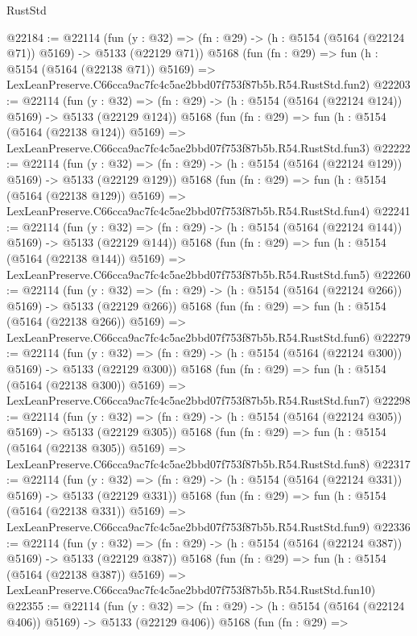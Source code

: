\begin{lexlean}{RustStd}
\begin{coremodule}
@22184 := @22114
    (fun (y : @32) => (fn : @29) -> (h : @5154 (@5164 (@22124 @71)) @5169) -> @5133 (@22129 @71))
    @5168
    (fun (fn : @29) =>
    fun (h : @5154 (@5164 (@22138 @71)) @5169) =>
    LexLeanPreserve.C66cca9ac7fc4c5ae2bbd07f753f87b5b.R54.RustStd.fun2)
@22203 := @22114
    (fun (y : @32) => (fn : @29) -> (h : @5154 (@5164 (@22124 @124)) @5169) -> @5133 (@22129 @124))
    @5168
    (fun (fn : @29) =>
    fun (h : @5154 (@5164 (@22138 @124)) @5169) =>
    LexLeanPreserve.C66cca9ac7fc4c5ae2bbd07f753f87b5b.R54.RustStd.fun3)
@22222 := @22114
    (fun (y : @32) => (fn : @29) -> (h : @5154 (@5164 (@22124 @129)) @5169) -> @5133 (@22129 @129))
    @5168
    (fun (fn : @29) =>
    fun (h : @5154 (@5164 (@22138 @129)) @5169) =>
    LexLeanPreserve.C66cca9ac7fc4c5ae2bbd07f753f87b5b.R54.RustStd.fun4)
@22241 := @22114
    (fun (y : @32) => (fn : @29) -> (h : @5154 (@5164 (@22124 @144)) @5169) -> @5133 (@22129 @144))
    @5168
    (fun (fn : @29) =>
    fun (h : @5154 (@5164 (@22138 @144)) @5169) =>
    LexLeanPreserve.C66cca9ac7fc4c5ae2bbd07f753f87b5b.R54.RustStd.fun5)
@22260 := @22114
    (fun (y : @32) => (fn : @29) -> (h : @5154 (@5164 (@22124 @266)) @5169) -> @5133 (@22129 @266))
    @5168
    (fun (fn : @29) =>
    fun (h : @5154 (@5164 (@22138 @266)) @5169) =>
    LexLeanPreserve.C66cca9ac7fc4c5ae2bbd07f753f87b5b.R54.RustStd.fun6)
@22279 := @22114
    (fun (y : @32) => (fn : @29) -> (h : @5154 (@5164 (@22124 @300)) @5169) -> @5133 (@22129 @300))
    @5168
    (fun (fn : @29) =>
    fun (h : @5154 (@5164 (@22138 @300)) @5169) =>
    LexLeanPreserve.C66cca9ac7fc4c5ae2bbd07f753f87b5b.R54.RustStd.fun7)
@22298 := @22114
    (fun (y : @32) => (fn : @29) -> (h : @5154 (@5164 (@22124 @305)) @5169) -> @5133 (@22129 @305))
    @5168
    (fun (fn : @29) =>
    fun (h : @5154 (@5164 (@22138 @305)) @5169) =>
    LexLeanPreserve.C66cca9ac7fc4c5ae2bbd07f753f87b5b.R54.RustStd.fun8)
@22317 := @22114
    (fun (y : @32) => (fn : @29) -> (h : @5154 (@5164 (@22124 @331)) @5169) -> @5133 (@22129 @331))
    @5168
    (fun (fn : @29) =>
    fun (h : @5154 (@5164 (@22138 @331)) @5169) =>
    LexLeanPreserve.C66cca9ac7fc4c5ae2bbd07f753f87b5b.R54.RustStd.fun9)
@22336 := @22114
    (fun (y : @32) => (fn : @29) -> (h : @5154 (@5164 (@22124 @387)) @5169) -> @5133 (@22129 @387))
    @5168
    (fun (fn : @29) =>
    fun (h : @5154 (@5164 (@22138 @387)) @5169) =>
    LexLeanPreserve.C66cca9ac7fc4c5ae2bbd07f753f87b5b.R54.RustStd.fun10)
@22355 := @22114
    (fun (y : @32) => (fn : @29) -> (h : @5154 (@5164 (@22124 @406)) @5169) -> @5133 (@22129 @406))
    @5168
    (fun (fn : @29) =>

\end{coremodule}
\end{lexlean}
